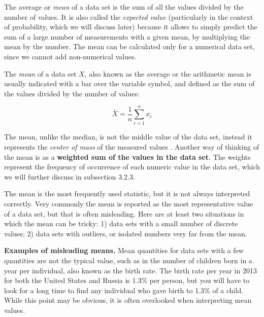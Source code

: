 \documentclass[
  letterpaper,
  DIV=11,
  numbers=noendperiod]{scrreprt}
\begin{document}
The average or  \emph{mean} of a data
set is the sum of all the values divided by the number of values. It is
also called the \emph{expected value} (particularly in the context of
probability, which we will discuss later) because it allows to simply
predict the sum of a large number of measurements with a given mean, by
multiplying the mean by the number. The mean can be calculated only for
a numerical data set, since we cannot add non-numerical values.

\begin{tcolorbox}[enhanced jigsaw, arc=.35mm, colframe=quarto-callout-note-color-frame, left=2mm, opacitybacktitle=0.6, breakable, title=\textcolor{quarto-callout-note-color}{\faInfo}\hspace{0.5em}{Definition}, toprule=.15mm, coltitle=black, bottomtitle=1mm, toptitle=1mm, colback=white, leftrule=.75mm, colbacktitle=quarto-callout-note-color!10!white, titlerule=0mm, opacityback=0, rightrule=.15mm, bottomrule=.15mm]

The \emph{mean} of a data set \(X\), also known as the average or the
arithmetic mean is usually indicated with a bar over the variable
symbol, and defined as the sum of the values divided by the number of
values:

\end{tcolorbox}

\begin{equation}
  \bar X  = \frac{1}{n} \sum_{i=1}^n x_i 
\label{eq:ch3_mean_def}
\end{equation}

The mean, unlike the median, is not the middle value of the data set,
instead it represents the \emph{center of mass} of the measured values
\cite{whitlock_analysis_2008}. Another way of thinking of the mean is as
a \textbf{weighted sum of the values in the data set}. The weights
represent the frequency of occurrence of each numeric value in the data
set, which we will further discuss in subsection 3.2.3.

The mean is the most frequently used statistic, but it is not always
interpreted correctly. Very commonly the mean is reported as the most
representative value of a data set, but that is often misleading. Here
are at least two situations in which the mean can be tricky: 1) data
sets with a small number of discrete values; 2) data sets with outliers,
or isolated numbers very far from the mean.

\textbf{Examples of misleading means.} Mean quantities for data sets
with a few quantities are not the typical value, such as in the number
of children born in a year per individual, also known as the birth rate.
The birth rate per year in 2013 for both the United States and Russia is
1.3\% per person, but you will have to look for a long time to find any
individual who gave birth to 1.3\% of a child. While this point may be
obvious, it is often overlooked when interpreting mean values.
\end{document}
